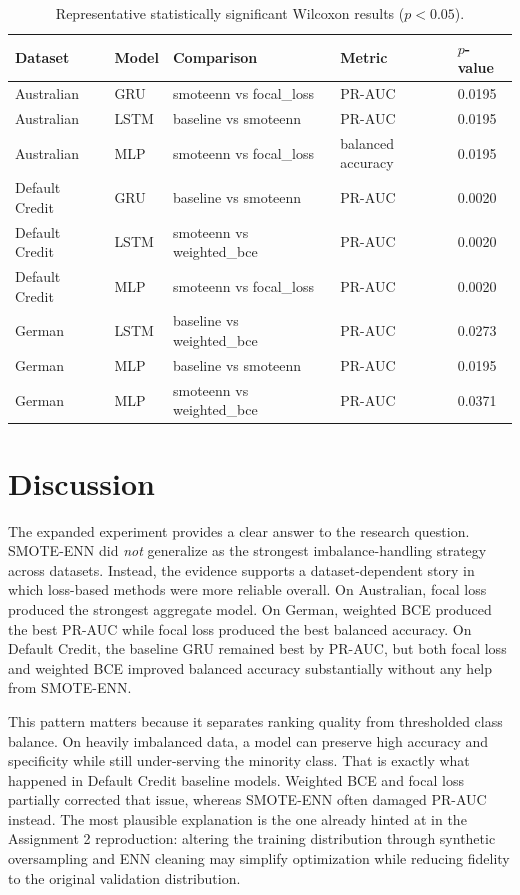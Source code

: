 \documentclass[11pt,a4paper]{article}
\begin{document}
\begin{table}[htbp]
\centering
\small
\caption{Representative statistically significant Wilcoxon results (\(p < 0.05\)).}
\label{tab:stats-summary}
\begin{tabular}{p{2.2cm}p{1.2cm}p{3.2cm}p{2.1cm}p{1.4cm}}
\toprule
Dataset & Model & Comparison & Metric & \(p\)-value \\
\midrule
Australian & GRU & smoteenn vs focal\_loss & PR-AUC & 0.0195 \\
Australian & LSTM & baseline vs smoteenn & PR-AUC & 0.0195 \\
Australian & MLP & smoteenn vs focal\_loss & balanced accuracy & 0.0195 \\
Default Credit & GRU & baseline vs smoteenn & PR-AUC & 0.0020 \\
Default Credit & LSTM & smoteenn vs weighted\_bce & PR-AUC & 0.0020 \\
Default Credit & MLP & smoteenn vs focal\_loss & PR-AUC & 0.0020 \\
German & LSTM & baseline vs weighted\_bce & PR-AUC & 0.0273 \\
German & MLP & baseline vs smoteenn & PR-AUC & 0.0195 \\
German & MLP & smoteenn vs weighted\_bce & PR-AUC & 0.0371 \\
\bottomrule
\end{tabular}
\end{table}

\section{Discussion}
The expanded experiment provides a clear answer to the research question. SMOTE-ENN did \emph{not} generalize as the strongest imbalance-handling strategy across datasets. Instead, the evidence supports a dataset-dependent story in which loss-based methods were more reliable overall. On Australian, focal loss produced the strongest aggregate model. On German, weighted BCE produced the best PR-AUC while focal loss produced the best balanced accuracy. On Default Credit, the baseline GRU remained best by PR-AUC, but both focal loss and weighted BCE improved balanced accuracy substantially without any help from SMOTE-ENN.

This pattern matters because it separates ranking quality from thresholded class balance. On heavily imbalanced data, a model can preserve high accuracy and specificity while still under-serving the minority class. That is exactly what happened in Default Credit baseline models. Weighted BCE and focal loss partially corrected that issue, whereas SMOTE-ENN often damaged PR-AUC instead. The most plausible explanation is the one already hinted at in the Assignment 2 reproduction: altering the training distribution through synthetic oversampling and ENN cleaning may simplify optimization while reducing fidelity to the original validation distribution.
\end{document}
